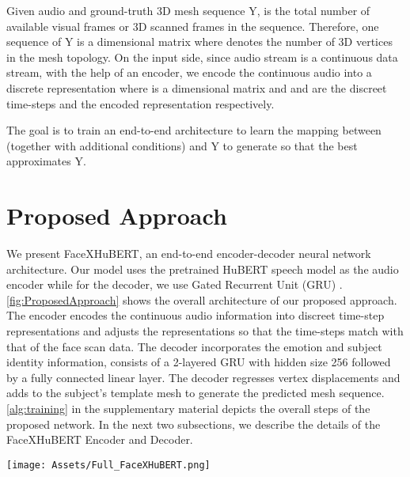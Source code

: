 \documentclass[10pt,twocolumn,letterpaper]{article}
\begin{document}
Given audio  and ground-truth 3D mesh sequence Y,  is the total number of available visual frames or 3D scanned frames in the sequence. Therefore, one sequence of Y is a  dimensional matrix where  denotes the number of 3D vertices in the mesh topology. On the input side, since audio stream  is a continuous data stream, with the help of an encoder, we encode the continuous audio into a discrete representation  where  is a  dimensional matrix and  and  are the discreet time-steps and the encoded representation respectively. 

The goal is to train an end-to-end architecture to learn the mapping between  (together with additional conditions) and Y to generate  so that the  best approximates Y. 

\section{Proposed Approach}
\label{sec:proposedapproach}
We present FaceXHuBERT, an end-to-end encoder-decoder neural network architecture. Our model uses the pretrained HuBERT speech model as the audio encoder while for the decoder, we use Gated Recurrent Unit (GRU) \cite{GRU}. \cref{fig:ProposedApproach} shows the overall architecture of our proposed approach. The encoder encodes the continuous audio information into discreet time-step representations and adjusts the representations so that the time-steps match with that of the face scan data. The decoder incorporates the emotion and subject identity information, consists of a 2-layered GRU with hidden size 256 followed by a fully connected linear layer. The decoder regresses vertex displacements and adds to the subject's template mesh to generate the predicted mesh sequence.  \cref{alg:training} in the supplementary material depicts the overall steps of the proposed network. In the next two subsections, we describe the details of the FaceXHuBERT Encoder and Decoder.

\begin{figure*}
  \centering
  \texttt{[image: Assets/Full\_FaceXHuBERT.png]}
  \caption{\textbf{FaceXHuBERT:} The encoder encodes the audio waveform  and produces discreet frame level embedding. The Input Representation Adjustment module in the encoder adjusts the encoded information with the output 4D scan data and produces  such that . The Decoder takes in  and with the help of the 2-layered 256 hidden sized GRU, produces the hidden representation . Additional conditions such as the speaker identity and emotion label are embedded and multiplied with  before the hidden representation is decoded into vertex displacement values and added to the corresponding subject's neutral face to produce the animation output . The loss function is computed based on  and ground-truth (GT), Y.}
  \label{fig:ProposedApproach}
\end{figure*}
\end{document}
